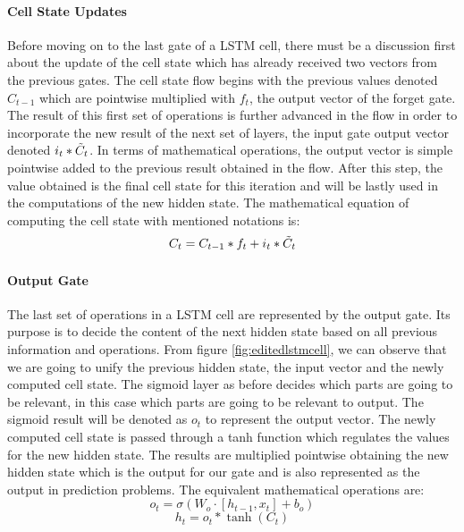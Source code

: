 \paragraph{Cell State Updates}\mbox{} 

\vspace{5mm}

Before moving on to the last gate of a LSTM cell, there must be a discussion first about the update of the cell state which has already received two vectors from the previous gates. The cell state flow begins with the previous values denoted $\displaystyle C_{t-1}$ which are pointwise multiplied with $\displaystyle f_t$, the output vector of the forget gate. The result of this first set of operations is further advanced in the flow in order to incorporate the new result of the next set of layers, the input gate output vector denoted $\displaystyle i_t * \Tilde{C}_t$. In terms of mathematical operations, the output vector is simple pointwise added to the previous result obtained in the flow. After this step, the value obtained is the final cell state for this iteration and will be lastly used in the computations of the new hidden state. The mathematical equation of computing the cell state with mentioned notations is:
\[ C_t = C_{t-1} * f_t + i_t * \Tilde{C}_t\]

\paragraph{Output Gate}\mbox{} 

\vspace{5mm}

The last set of operations in a LSTM cell are represented by the output gate. Its purpose is to decide the content of the next hidden state based on all previous information and operations. From figure \ref{fig:editedlstmcell}, we can observe that we are going to unify the previous hidden state, the input vector and the newly computed cell state. The sigmoid layer as before decides which parts are going to be relevant, in this case which parts are going to be relevant to output. The sigmoid result will be denoted as $\displaystyle o_t$ to represent the output vector. The newly computed cell state is passed through a tanh function which regulates the values for the new hidden state. The results are multiplied pointwise obtaining the new hidden state which is the output for our gate and is also represented as the output in prediction problems. The equivalent mathematical operations are:
\[ o_t = \sigma(W_o\cdot[h_{t-1},x_t]+b_o)\]
\[ h_t = o_t * \tanh(C_t) \]

